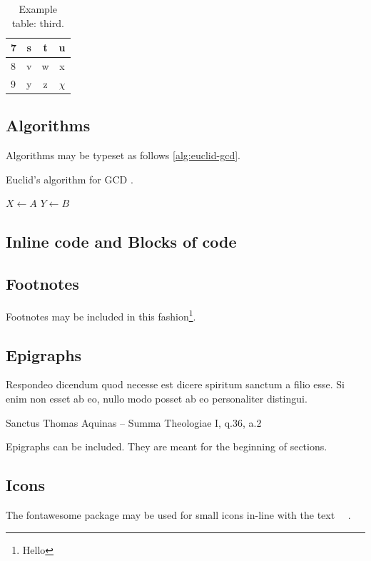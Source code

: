 \begin{table} \caption{\label{tab:example3} Example table: third.}
\begin{tabular}{l | c c c} \hline
7 & s & t & u \\ \hline
8 & v & w & x \\ \hline
9 & y & z & $\chi$ \\
\hline \end{tabular}
\end{table}

\subsection{Algorithms}
Algorithms may be typeset as follows \cref{alg:euclid-gcd}.

\begin{algorithm}
\caption{\label{alg:euclid-gcd} Euclid's algorithm for \gls{GCD}
\cite{enwiki:euclid-algorithm}.}

\BlankLine
$X \gets A$\;
$Y \gets B$\;
\end{algorithm}

\subsection{Inline code and Blocks of code}

\subsection{Footnotes}
Footnotes may be included in this fashion\footnote{Hello}.

\subsection{Epigraphs}
\epigraph{Respondeo dicendum quod necesse est dicere spiritum sanctum a filio
esse. Si enim non esset ab eo, nullo modo posset ab eo personaliter distingui.}
{Sanctus Thomas Aquinas -- Summa Theologiae I, q.36, a.2}

Epigraphs can be included. They are meant for the beginning of sections.

\subsection{Icons}
The fontawesome package \cite{fontawesome-latex} may be used for small icons
in-line with the text \faSmileO~\faMedkit~\faBicycle.

